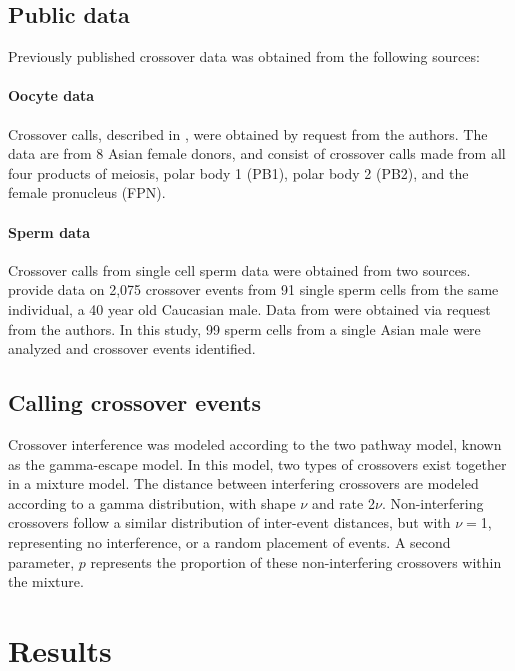 \subsection{Public data}
Previously published crossover data was obtained from the following sources:

\paragraph{Oocyte data}
Crossover calls, described in \citet{Hou2013}, were obtained by request from the authors.
The data are from 8 Asian female donors, and consist of crossover calls made from all four products of meiosis, polar body 1 (PB1), polar body 2 (PB2), and the female pronucleus (FPN).

\paragraph{Sperm data}
Crossover calls from single cell sperm data were obtained from two sources.
%
\citet{Wang2012} provide data on 2,075 crossover events from 91 single sperm cells from the same individual, a 40 year old Caucasian male.
%
Data from \citet{Lu2012} were obtained via request from the authors.
In this study, 99 sperm cells from a single Asian male were analyzed and crossover events identified.

\subsection{Calling crossover events}
Crossover interference was modeled according to the two pathway model, known as the gamma-escape model.
In this model, two types of crossovers exist together in a mixture model.
The distance between interfering crossovers are modeled according to a gamma distribution, with shape $\nu$ and rate 2$\nu$.
Non-interfering crossovers follow a similar distribution of inter-event distances, but with $\nu=$1, representing no interference, or a random placement of events.
A second parameter, $p$ represents the proportion of these non-interfering crossovers within the mixture.


\section{Results}
